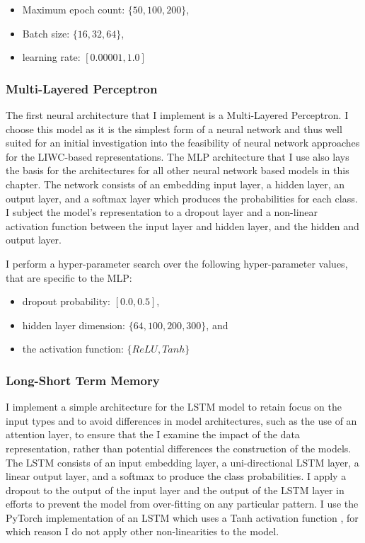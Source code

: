 \begin{itemize}
  \item Maximum epoch count: $\{50, 100, 200\}$,
  \item Batch size: $\{16, 32, 64\}$,
  \item learning rate: $[0.00001, 1.0]$
\end{itemize}

\subsubsection{Multi-Layered Perceptron}

The first neural architecture that I implement is a Multi-Layered Perceptron. 
I choose this model as it is the simplest form of a neural network and thus well suited for an initial investigation into the feasibility of neural network approaches for the LIWC-based representations. 
The MLP architecture that I use also lays the basis for the architectures for all other neural network based models in this chapter. 
The network consists of an embedding input layer, a hidden layer, an output layer, and a softmax layer which produces the probabilities for each class. 
I subject the model's representation to a dropout layer and a non-linear activation function between the input layer and hidden layer, and the hidden and output layer.

I perform a hyper-parameter search over the following hyper-parameter values, that are specific to the MLP:

\begin{itemize}
  \item dropout probability: $[0.0, 0.5]$,
  \item hidden layer dimension: $\{64, 100, 200, 300\}$, and
  \item the activation function: $\{ReLU, Tanh\}$
\end{itemize}

\subsubsection{Long-Short Term Memory}
I implement a simple architecture for the LSTM model to retain focus on the input types and to avoid differences in model architectures, such as the use of an attention layer, to ensure that the I examine the impact of the data representation, rather than potential differences the construction of the models.
The LSTM consists of an input embedding layer, a uni-directional LSTM layer, a linear output layer, and a softmax to produce the class probabilities.
I apply a dropout to the output of the input layer and the output of the LSTM layer in efforts to prevent the model from over-fitting on any particular pattern. 
I use the PyTorch implementation of an LSTM which uses a Tanh activation function \citep{Paszke:2019}, for which reason I do not apply other non-linearities to the model.


